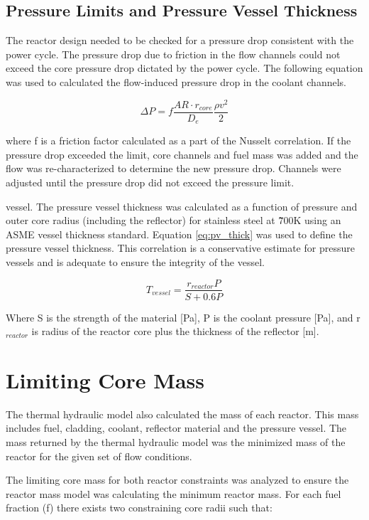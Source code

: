 \subsection{Pressure Limits and Pressure Vessel Thickness}
The reactor design needed to be checked for a pressure drop consistent with the
power cycle. The pressure drop due to friction in the flow channels could not
exceed the core pressure drop dictated by the power cycle. The following
equation was used to calculated the flow-induced pressure drop in the coolant
channels.

\begin{equation}
    \Delta P = f \frac{AR\cdot r_{core}}{D_e} \frac{\rho v^2}{2}
\end{equation}

where f is a friction factor calculated as a part of the Nusselt correlation. If the
pressure drop exceeded the limit, core channels and fuel mass was added and the
flow was re-characterized to determine the new pressure drop. Channels were adjusted
until the pressure drop did not exceed the pressure limit.

vessel. The pressure vessel thickness was calculated as a function of pressure
and outer core radius (including the reflector) for stainless steel at \~700K
using an ASME vessel thickness standard. Equation \ref{eq:pv_thick} was used to
define the pressure vessel thickness. This correlation is a conservative
estimate for pressure vessels and is adequate to ensure the integrity of the
vessel.

\begin{equation}
    T_{vessel} = \frac{r_{reactor}P}{S + 0.6P}
    \label{eq:pv_thick}
\end{equation}

Where S is the strength of the material [Pa], P is the coolant pressure [Pa],
and r$_{reactor}$ is radius of the reactor core plus the thickness of the
reflector [m].

\section{Limiting Core Mass}
The thermal hydraulic model also calculated the mass of each reactor. This
mass includes fuel, cladding, coolant, reflector material and the pressure
vessel. The mass returned by the thermal hydraulic model was the minimized mass
of the reactor for the given set of flow conditions.

The limiting core mass for both reactor constraints was analyzed to ensure the
reactor mass model was calculating the minimum reactor mass. For each fuel
fraction (f) there exists two constraining core radii such that:

